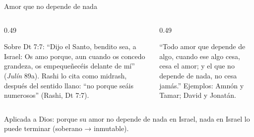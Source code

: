 \begin{frame}{Amor que no depende de nada}
\begin{columns}[t,onlytextwidth]
\begin{column}{0.49\textwidth}
\begin{tcolorbox}[colback=papiro,colframe=azul,boxrule=0.8pt,arc=3pt,title={``Porque os empequeñecéis''},coltitle=papiro,colbacktitle=azul,fonttitle=\scriptsize\bfseries]
\scriptsize Sobre Dt 7:7: ``Dijo el Santo, bendito sea, a Israel: Os amo porque, aun cuando os concedo grandeza, os empequeñecéis delante de mí'' (\emph{Julín} 89a). Rashi lo cita como midrash, después del sentido llano: ``no porque seáis numerosos'' (Rashi, Dt 7:7).
\end{tcolorbox}
\end{column}
\begin{column}{0.49\textwidth}
\begin{tcolorbox}[colback=papiro,colframe=azul,boxrule=0.8pt,arc=3pt,title={\emph{Pirké Avot} 5:16},coltitle=papiro,colbacktitle=azul,fonttitle=\scriptsize\bfseries]
\scriptsize ``Todo amor que depende de algo, cuando ese algo cesa, cesa el amor; y el que no depende de nada, no cesa jamás.'' Ejemplos: Amnón y Tamar; David y Jonatán.
\end{tcolorbox}
\end{column}
\end{columns}\medskip
\small Aplicada a Dios: porque su amor no depende de nada en Israel, nada en Israel lo puede terminar (soberano → inmutable).\par\smallskip
{}
\end{frame}

